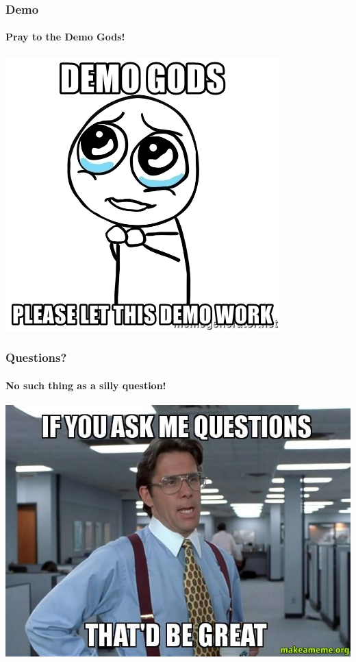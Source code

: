 \documentclass[aspectratio=169]{beamer}
\begin{document}
\begin{frame}
  \frametitle{Demo}
  \framesubtitle{Pray to the Demo Gods!}
  \begin{center}
    \includegraphics[scale=0.5]{demogods}
  \end{center}
\end{frame}

\begin{frame}
  \frametitle{Questions?}
  \framesubtitle{No such thing as a silly question!}
  \begin{center}
    \includegraphics[scale=0.4]{questions}
  \end{center}
\end{frame}
\end{document}
